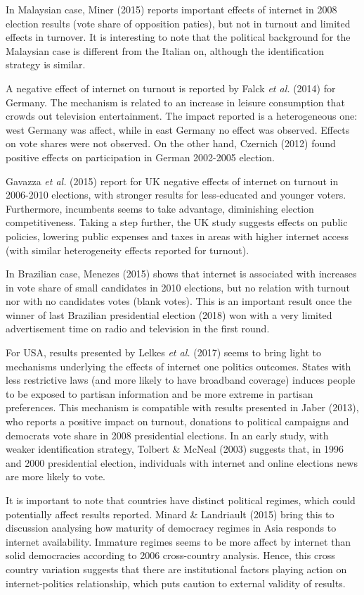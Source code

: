 \documentclass[12pt,]{article}
\begin{document}
In Malaysian case, Miner (2015) reports important effects of internet in
2008 election results (vote share of opposition paties), but not in
turnout and limited effects in turnover. It is interesting to note that
the political background for the Malaysian case is different from the
Italian on, although the identification strategy is similar.

A negative effect of internet on turnout is reported by Falck \emph{et
al.} (2014) for Germany. The mechanism is related to an increase in
leisure consumption that crowds out television entertainment. The impact
reported is a heterogeneous one: west Germany was affect, while in east
Germany no effect was observed. Effects on vote shares were not
observed. On the other hand, Czernich (2012) found positive effects on
participation in German 2002-2005 election.

Gavazza \emph{et al.} (2015) report for UK negative effects of internet
on turnout in 2006-2010 elections, with stronger results for
less-educated and younger voters. Furthermore, incumbents seems to take
advantage, diminishing election competitiveness. Taking a step further,
the UK study suggests effects on public policies, lowering public
expenses and taxes in areas with higher internet access (with similar
heterogeneity effects reported for turnout).

In Brazilian case, Menezes (2015) shows that internet is associated with
increases in vote share of small candidates in 2010 elections, but no
relation with turnout nor with no candidates votes (blank votes). This
is an important result once the winner of last Brazilian presidential
election (2018) won with a very limited advertisement time on radio and
television in the first round.

For USA, results presented by Lelkes \emph{et al.} (2017) seems to bring
light to mechanisms underlying the effects of internet one politics
outcomes. States with less restrictive laws (and more likely to have
broadband coverage) induces people to be exposed to partisan information
and be more extreme in partisan preferences. This mechanism is
compatible with results presented in Jaber (2013), who reports a
positive impact on turnout, donations to political campaigns and
democrats vote share in 2008 presidential elections. In an early study,
with weaker identification strategy, Tolbert \& McNeal (2003) suggests
that, in 1996 and 2000 presidential election, individuals with internet
and online elections news are more likely to vote.

It is important to note that countries have distinct political regimes,
which could potentially affect results reported. Minard \& Landriault
(2015) bring this to discussion analysing how maturity of democracy
regimes in Asia responds to internet availability. Immature regimes
seems to be more affect by internet than solid democracies according to
2006 cross-country analysis. Hence, this cross country variation
suggests that there are institutional factors playing action on
internet-politics relationship, which puts caution to external validity
of results.
\end{document}
